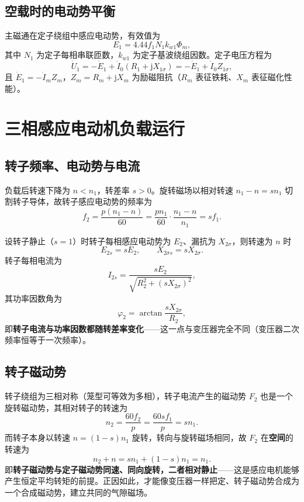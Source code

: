 \subsection{空载时的电动势平衡}
主磁通在定子绕组中感应电动势，有效值为
\begin{equation}
E_1=4.44f_1N_1k_{w1}\Phi_m ,
\end{equation}
其中 $N_1$ 为定子每相串联匝数，$k_{w1}$ 为定子基波绕组因数。定子电压方程为
\begin{equation}
\dot U_1=-\dot E_1+\dot I_0\left(R_1+\mathrm{j}X_{1\sigma}\right)=-\dot E_1+\dot I_0Z_{1\sigma},
\end{equation}
且 $\dot E_1=-\dot I_mZ_m$，$Z_m=R_m+\mathrm{j}X_m$ 为励磁阻抗（$R_m$ 表征铁耗、$X_m$ 表征磁化性能）。

\section{三相感应电动机负载运行}

\subsection{转子频率、电动势与电流}
负载后转速下降为 $n<n_1$，转差率 $s>0$。旋转磁场以相对转速 $n_1-n=sn_1$ 切割转子导体，故转子感应电动势的频率为
\begin{equation}
f_2=\frac{p\left(n_1-n\right)}{60}=\frac{pn_1}{60}\cdot\frac{n_1-n}{n_1}=sf_1 .
\end{equation}


设转子静止（$s=1$）时转子每相感应电动势为 $E_2$、漏抗为 $X_{2\sigma}$，则转速为 $n$ 时
\begin{equation}
E_{2s}=sE_2,\qquad X_{2\sigma s}=sX_{2\sigma}.
\end{equation}
转子每相电流为
\begin{equation}
I_{2s}=\frac{sE_2}{\sqrt{R_2^{2}+\left(sX_{2\sigma}\right)^{2}}},
\end{equation}
其功率因数角为
\begin{equation}
\varphi_2=\arctan\frac{sX_{2\sigma}}{R_2},
\end{equation}
即\textbf{转子电流与功率因数都随转差率变化}——这一点与变压器完全不同（变压器二次频率恒等于一次频率）。

\subsection{转子磁动势}
转子绕组为三相对称（笼型可等效为多相），转子电流产生的磁动势 $F_2$ 也是一个旋转磁动势，其相对转子的转速为
\begin{equation}
n_{2}=\frac{60f_2}{p}=\frac{60sf_1}{p}=sn_1 .
\end{equation}
而转子本身以转速 $n=(1-s)n_1$ 旋转，转向与旋转磁场相同，故 $F_2$ 在\textbf{空间}的转速为
\begin{equation}
n_{2}+n=sn_1+(1-s)n_1=n_1 .
\end{equation}
即\textbf{转子磁动势与定子磁动势同速、同向旋转，二者相对静止}——这是感应电机能够产生恒定平均转矩的前提。正因如此，才能像变压器一样把定、转子磁动势合成为一个合成磁动势，建立共同的气隙磁场。

